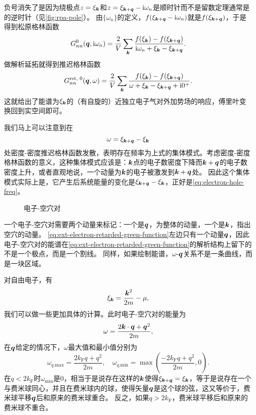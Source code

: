 负号消失了是因为绕极点$z=\xi_{\vb*{k}}$和$z = \xi_{\vb*{k} + \vb*{q}} - \mathrm{i} \omega_n$是顺时针而不是留数定理通常是的逆时针（见\autoref{fig:rpa-pole}）。
由$\{\omega_n\}$的定义，$f(\xi_{\vb*{k} + \vb*{q}} - \mathrm{i} \omega_n)$就是$f(\xi_{\vb*{k} + \vb*{q}})$，于是得到松原格林函数
\begin{equation}
    G_{nn}^\text{0}(\vb*{q}, \mathrm{i} \omega_n) = \frac{2}{V} \sum_{\vb*{k}} \frac{f(\xi_{\vb*{k}}) - f(\xi_{\vb*{k} + \vb*{q}})}{\mathrm{i} \omega_n + \xi_{\vb*{k}} - \xi_{\vb*{k} + \vb*{q}}}.
\end{equation}
做解析延拓就得到推迟格林函数
\begin{equation}
    G_{nn}^\text{ret, 0}(\vb*{q}, \omega) = \frac{2}{V} \sum_{\vb*{k}} \frac{f(\xi_{\vb*{k}}) - f(\xi_{\vb*{k} + \vb*{q}})}{\omega + \xi_{\vb*{k}} - \xi_{\vb*{k} + \vb*{q}} + \mathrm{i} 0^+}.
    \label{eq:ext-electron-retarded-green-function}
\end{equation}
这就给出了能谱为$\xi_{\vb*{k}}$的（有自旋的）近独立电子气对外加势场的响应，傅里叶变换回到实空间即可。

我们马上可以注意到在
\begin{equation}
    \omega = \xi_{\vb*{k} + \vb*{q}} - \xi_{\vb*{k}}
    \label{eq:electron-hole-freq}
\end{equation}
处密度-密度推迟格林函数发散，表明存在频率为上式的集体模式。考虑密度-密度格林函数的意义，这种集体模式应该是：$\vb*{k}$点的电子数密度下降而$\vb*{k}+\vb*{q}$的电子数密度上升，或者直观地说，一个动量为$\vb*{k}$的电子被激发到$\vb*{k}+\vb*{q}$处。
因此这个集体模式实际上是，它产生后系统能量的变化是$\xi_{\vb*{k} + \vb*{q}} - \xi_{\vb*{k}}$，正好是\eqref{eq:electron-hole-freq}。

\begin{figure}
    \centering
    
    \caption{电子-空穴对}
\end{figure}

一个电子-空穴对需要两个动量来标记：一个是$\vb*{q}$，为整体的动量，一个是$\vb*{k}$，指出空穴的动量。
\eqref{eq:ext-electron-retarded-green-function}左边只有一个动量$\vb*{q}$，因此电子-空穴对的能谱在\eqref{eq:ext-electron-retarded-green-function}的解析结构上留下的不是一个极点，而是一个割线。
同样，如果绘制能谱，$\omega$-$\vb*{q}$关系不是一条曲线，而是一块区域。

对自由电子，有
\[
    \xi_{\vb*{k}} = \frac{\vb*{k}^2}{2m} - \mu,
\]
我们可以做一些更加具体的计算。此时电子-空穴对的能量为
\begin{equation}
    \omega = \frac{2 \vb*{k} \cdot \vb*{q} + \vb*{q}^2}{2m},
\end{equation}
在$\vb*{q}$给定的情况下，$\omega$最大值和最小值分别为
\begin{equation}
    \omega_\text{$q$,max} = \frac{2 k_\text{F} q + q^2}{2m}, \quad \omega_\text{$q$,min} = \max(\frac{- 2 k_\text{F} q + q^2}{2m}, 0).
\end{equation}
在$q < 2 k_\text{F}$时$\omega_\text{min}$是$0$，相当于是说存在这样的$\vb*{k}$使得$\xi_{\vb*{k} + \vb*{q}} = \xi_{\vb*{k}}$，等于是说存在一个与费米球同心，并且在费米球内的球，使得矢量$\vb*{q}$是这个球的弦，这又等价于，费米球平移$\vb*{q}$后和原来的费米球重合。
反之，如果$q > 2 k_\text{F}$，费米球平移后和原来的费米球不重合。

